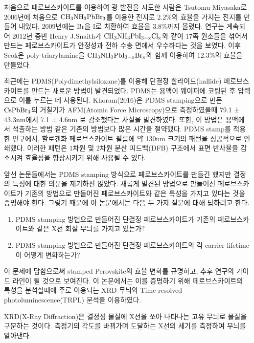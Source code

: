 처음으로 페로브스카이트를 이용하여 광 발전을 시도한 사람은 Tsutomu Miyasaka로 2006년에 처음으로 $\rm{CH_3NH_3PbBr_3}$를 이용한 전지로 2.2\%의 효율을 가지는 전지를 만들어 내었다\cite{kojima2006novel}. 2009년에는 Br을 I로 치환하여 효율을 3.8\%까지 올렸다\cite{kojima2009organometal}. 연구는 계속되어 2012년 중반 Henry J.Snaith가  $\rm{CH_{3}NH_3PbI_{3-x}Cl_x}$와 같이 17족 원소들을 섞어서 만드는 페로브스카이트가 안정성과 전하 수송 면에서 우수하다는 것을 보였다\cite{lee2012efficient}. 이후 Seok은 poly-triarylamine을 $\rm{CH_{3}NH_3PbI_{3-x}Br_x}$와 함께 이용하여 12.3\%의 효율을 만들었다\cite{noh2013chemical}.

최근에는 PDMS(Polydimethylsiloxane)를 이용해 단결정 할라이드(hallide) 페로브스카이트를 만드는 새로운 방법이 발견되었다. PDMS는 용액이 웨이퍼에 코팅된 후 압력으로 이를 누르는 데 사용된다. Khoram(2016)은 PDMS stamping으로 만든 $\rm{CsPbBr_3}$의 거칠기가  AFM(Atomic Force Microscopy)으로 측정하였을때 79.1 ± 43.3nm에서 7.1 ± 4.6nm 로 감소했다는 사실을 발견하였다\cite{khoram2016growth}. 또한, 이 방법은 용액에서 석출하는 방법 같은 기존의 방법보다 많은 시간을 절약했다. PDMS stamp를 적용한 연구에서, 할로겐화 페로브스카이트 필름에 약 130nm 크기의 패턴을 성공적으로 인쇄했다\cite{brittman2017controlling}. 이러한 패턴은 1차원 및 2차원 분산 피드백(DFB) 구조에서 표면 반사율을 감소시켜 효율성을 향상시키기 위해 사용될 수 있다.

앞선 논문들에서는 PDMS stamping 방식으로 페로브스카이트를 만들긴 했지만 결정의 특성에 대한 의문을 제기하진 않았다. 새롭게 발견된 방법으로 만들어진 페로브스카이트가 기존의 방법으로 만들어진 페로브스카이트와 같은 특성을 가지고 있다는 것을 증명해야 한다. 그렇기 때문에 이 논문에서는 다음 두 가지 질문에 대해 답하려고 한다.

\begin{enumerate}
	\item PDMS stamping 방법으로 만들어진 단결정 페로브스카이트가 기존의 페로브스카이트와 같은 X선 회절 무늬를 가지고 있는가?
	\item PDMS stamping 방법으로 만들어진 단결정 페로브스카이트의 각 carrier lifetime이 어떻게 변화하는가?
\end{enumerate}

이 문제에 답함으로써 stamped Perovskite의 효율 변화를 규명하고, 추후 연구의 가이드 라인이 될 것으로 보여진다. 이 논문에서는 이를 증명하기 위해 페로브스카이트의 특성을 분석할때에 주로 이용되는 XRD 무늬와 Time-resolved photoluminescence(TRPL) 분석을 이용하였다.

XRD(X-Ray Diffraction)은 결정성 물질에 X선을 쏘아 나타나는 고유 무늬로 물질을 구분하는 것이다. 측정기의 각도를 바꿔가며 도달하는 X선의 세기를 측정하여 무늬를 알아낸다. 

